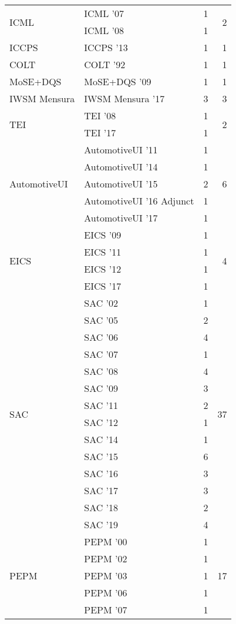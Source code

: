 \begin{table*}[t]
\begin{tabular}{llrr}
\multirow{2}{*}{ICML } & ICML '07 & 1 & \multirow{2}{*}{2}\\
& ICML '08 & 1 &\\
\multirow{1}{*}{ICCPS } & ICCPS '13 & 1 & \multirow{1}{*}{1}\\
\multirow{1}{*}{COLT } & COLT '92 & 1 & \multirow{1}{*}{1}\\
\multirow{1}{*}{MoSE+DQS } & MoSE+DQS '09 & 1 & \multirow{1}{*}{1}\\
\multirow{1}{*}{IWSM Mensura } & IWSM Mensura '17 & 3 & \multirow{1}{*}{3}\\
\multirow{2}{*}{TEI } & TEI '08 & 1 & \multirow{2}{*}{2}\\
& TEI '17 & 1 &\\
\multirow{5}{*}{AutomotiveUI } & AutomotiveUI '11 & 1 & \multirow{5}{*}{6}\\
& AutomotiveUI '14 & 1 &\\
& AutomotiveUI '15 & 2 &\\
& AutomotiveUI '16 Adjunct & 1 &\\
& AutomotiveUI '17 & 1 &\\
\multirow{4}{*}{EICS } & EICS '09 & 1 & \multirow{4}{*}{4}\\
& EICS '11 & 1 &\\
& EICS '12 & 1 &\\
& EICS '17 & 1 &\\
\multirow{14}{*}{SAC } & SAC '02 & 1 & \multirow{14}{*}{37}\\
& SAC '05 & 2 &\\
& SAC '06 & 4 &\\
& SAC '07 & 1 &\\
& SAC '08 & 4 &\\
& SAC '09 & 3 &\\
& SAC '11 & 2 &\\
& SAC '12 & 1 &\\
& SAC '14 & 1 &\\
& SAC '15 & 6 &\\
& SAC '16 & 3 &\\
& SAC '17 & 3 &\\
& SAC '18 & 2 &\\
& SAC '19 & 4 &\\
\multirow{14}{*}{PEPM } & PEPM '00 & 1 & \multirow{14}{*}{17}\\
& PEPM '02 & 1 &\\
& PEPM '03 & 1 &\\
& PEPM '06 & 1 &\\
& PEPM '07 & 1 &\\

\end{tabular}
\end{table*}
